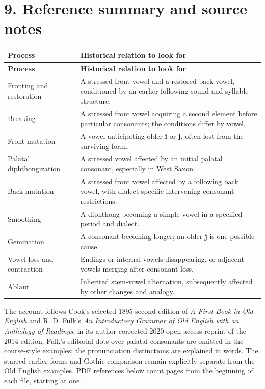\section*{9. Reference summary and source notes}
\begingroup
\fontsize{10.5}{13.2}\selectfont
\setlength{\LTleft}{0pt}
\setlength{\LTright}{0pt plus 1fil}
\begin{longtable}{@{}>{\raggedright\arraybackslash}p{}>{\raggedright\arraybackslash}p{}@{}}
\toprule
\textbf{Process} & \textbf{Historical relation to look for} \\
\midrule
\endfirsthead
\toprule
\textbf{Process} & \textbf{Historical relation to look for} \\
\midrule
\endhead
\bottomrule
\endfoot
\bottomrule
\endlastfoot
Fronting and restoration & A stressed front vowel and a restored back vowel, conditioned by an earlier following sound and syllable structure. \\
Breaking & A stressed front vowel acquiring a second element before particular consonants; the conditions differ by vowel. \\
Front mutation & A vowel anticipating older \textbf{i} or \textbf{j}, often lost from the surviving form. \\
Palatal diphthongization & A stressed vowel affected by an initial palatal consonant, especially in West Saxon. \\
Back mutation & A stressed front vowel affected by a following back vowel, with dialect-specific intervening-consonant restrictions. \\
Smoothing & A diphthong becoming a simple vowel in a specified period and dialect. \\
Gemination & A consonant becoming longer; an older \textbf{j} is one possible cause. \\
Vowel loss and contraction & Endings or internal vowels disappearing, or adjacent vowels merging after consonant loss. \\
Ablaut & Inherited stem-vowel alternation, subsequently affected by other changes and analogy. \\
\end{longtable}
\endgroup
The account follows Cook’s selected 1895 second edition of \emph{A First Book in Old English} and R. D. Fulk’s \emph{An Introductory Grammar of Old English with an Anthology of Readings}, in its author-corrected 2020 open-access reprint of the 2014 edition. Fulk’s editorial dots over palatal consonants are omitted in the course-style examples; the pronunciation distinctions are explained in words. The starred earlier forms and Gothic comparison remain explicitly separate from the Old English examples. PDF references below count pages from the beginning of each file, starting at one.\par
